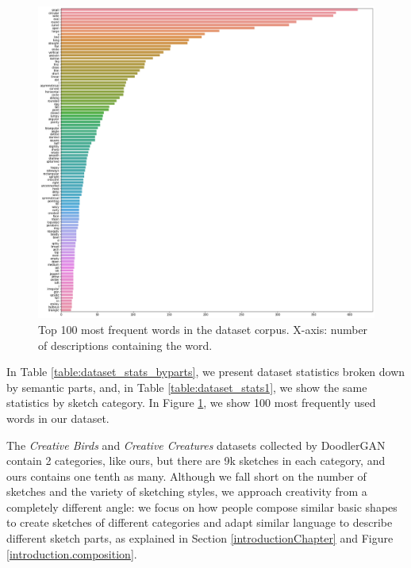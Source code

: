 \begin{figure}[!h]
\includegraphics[width=\linewidth]{dataset_image/word_freq_face.png}  
\caption{Top 100 most frequent words in the dataset corpus. X-axis: number of descriptions containing the word.}
\label{word_freq}
\end{figure}

In Table \ref{table:dataset_stats_byparts}, we present dataset statistics broken down by semantic parts, and, in Table \ref{table:dataset_stats1}, we show the same statistics by sketch category. In Figure \ref{word_freq}, we show 100 most frequently used words in our dataset. 

The \textit{Creative Birds} and \textit{Creative Creatures} datasets collected by DoodlerGAN \citep{doodlerGAN} contain 2 categories, like ours, but there are 9k sketches in each category, and ours contains one tenth as many. Although we fall short on the number of sketches and the variety of sketching styles, we approach creativity from a completely different angle: we focus on how people compose similar basic shapes to create sketches of different categories and adapt similar language to describe different sketch parts, as explained in Section \ref{introductionChapter} and Figure \ref{introduction.composition}.  

